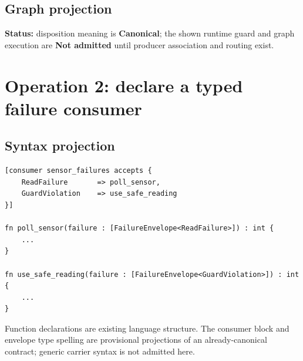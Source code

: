 \documentclass[11pt,a4paper]{article}
\newcommand{\canonical}{\textcolor{LyraGreen}{\textbf{Canonical}}\xspace}
\newcommand{\notadmitted}{\textcolor{LyraRed}{\textbf{Not admitted}}\xspace}
\newcommand{\code}[1]{\texttt{#1}}
\begin{document}
\subsection*{Graph projection}

\begin{center}
\end{center}

\textbf{Status:} disposition meaning is \canonical; the shown runtime guard
and graph execution are \notadmitted until producer association and routing exist.

\section{Operation 2: declare a typed failure consumer}

\subsection*{Syntax projection}

\begin{lstlisting}[style=lyraform]
[consumer sensor_failures accepts {
    ReadFailure       => poll_sensor,
    GuardViolation    => use_safe_reading
}]

fn poll_sensor(failure : [FailureEnvelope<ReadFailure>]) : int {
    ...
}

fn use_safe_reading(failure : [FailureEnvelope<GuardViolation>]) : int {
    ...
}
\end{lstlisting}

Function declarations are existing language structure. The consumer block and
envelope type spelling are provisional projections of an already-canonical
contract; generic carrier syntax is not admitted here.
\end{document}
